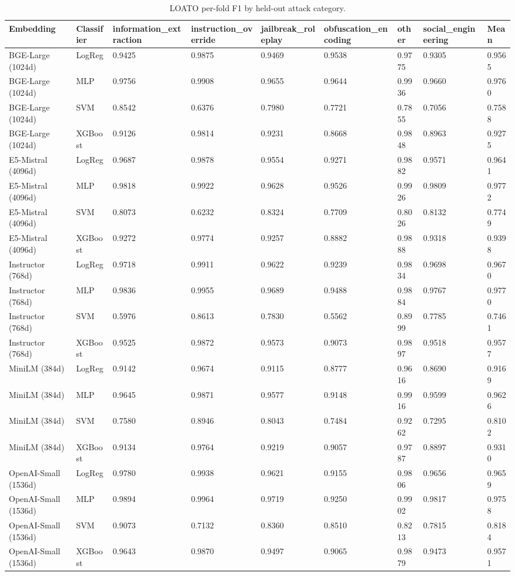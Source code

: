 \begin{table}[htbp]
\centering
\caption{LOATO per-fold F1 by held-out attack category.}
\label{tab:per-fold}
\begin{tabular}{lllllllll}
\toprule
Embedding & Classifier & information\_extraction & instruction\_override & jailbreak\_roleplay & obfuscation\_encoding & other & social\_engineering & Mean \\
\midrule
BGE-Large (1024d) & LogReg & 0.9425 & 0.9875 & 0.9469 & 0.9538 & 0.9775 & 0.9305 & 0.9565 \\
BGE-Large (1024d) & MLP & 0.9756 & 0.9908 & 0.9655 & 0.9644 & 0.9936 & 0.9660 & 0.9760 \\
BGE-Large (1024d) & SVM & 0.8542 & 0.6376 & 0.7980 & 0.7721 & 0.7855 & 0.7056 & 0.7588 \\
BGE-Large (1024d) & XGBoost & 0.9126 & 0.9814 & 0.9231 & 0.8668 & 0.9848 & 0.8963 & 0.9275 \\
E5-Mistral (4096d) & LogReg & 0.9687 & 0.9878 & 0.9554 & 0.9271 & 0.9882 & 0.9571 & 0.9641 \\
E5-Mistral (4096d) & MLP & 0.9818 & 0.9922 & 0.9628 & 0.9526 & 0.9926 & 0.9809 & 0.9772 \\
E5-Mistral (4096d) & SVM & 0.8073 & 0.6232 & 0.8324 & 0.7709 & 0.8026 & 0.8132 & 0.7749 \\
E5-Mistral (4096d) & XGBoost & 0.9272 & 0.9774 & 0.9257 & 0.8882 & 0.9888 & 0.9318 & 0.9398 \\
Instructor (768d) & LogReg & 0.9718 & 0.9911 & 0.9622 & 0.9239 & 0.9834 & 0.9698 & 0.9670 \\
Instructor (768d) & MLP & 0.9836 & 0.9955 & 0.9689 & 0.9488 & 0.9884 & 0.9767 & 0.9770 \\
Instructor (768d) & SVM & 0.5976 & 0.8613 & 0.7830 & 0.5562 & 0.8999 & 0.7785 & 0.7461 \\
Instructor (768d) & XGBoost & 0.9525 & 0.9872 & 0.9573 & 0.9073 & 0.9897 & 0.9518 & 0.9577 \\
MiniLM (384d) & LogReg & 0.9142 & 0.9674 & 0.9115 & 0.8777 & 0.9616 & 0.8690 & 0.9169 \\
MiniLM (384d) & MLP & 0.9645 & 0.9871 & 0.9577 & 0.9148 & 0.9916 & 0.9599 & 0.9626 \\
MiniLM (384d) & SVM & 0.7580 & 0.8946 & 0.8043 & 0.7484 & 0.9262 & 0.7295 & 0.8102 \\
MiniLM (384d) & XGBoost & 0.9134 & 0.9764 & 0.9219 & 0.9057 & 0.9787 & 0.8897 & 0.9310 \\
OpenAI-Small (1536d) & LogReg & 0.9780 & 0.9938 & 0.9621 & 0.9155 & 0.9806 & 0.9656 & 0.9659 \\
OpenAI-Small (1536d) & MLP & 0.9894 & 0.9964 & 0.9719 & 0.9250 & 0.9902 & 0.9817 & 0.9758 \\
OpenAI-Small (1536d) & SVM & 0.9073 & 0.7132 & 0.8360 & 0.8510 & 0.8213 & 0.7815 & 0.8184 \\
OpenAI-Small (1536d) & XGBoost & 0.9643 & 0.9870 & 0.9497 & 0.9065 & 0.9879 & 0.9473 & 0.9571 \\
\bottomrule
\end{tabular}

\end{table}
